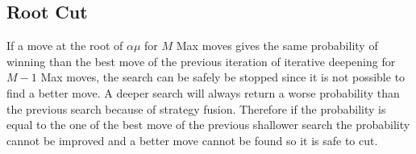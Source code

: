 \documentclass{ecai}
\begin{document}





\subsection{Root Cut}

If a move at the root of $\alpha\mu$ for $M$ Max moves gives the same
probability of winning than the best move of the previous iteration of
iterative deepening for $M-1$ Max moves, the search can be safely be
stopped since it is not possible to find a better move. A deeper
search will always return a worse probability than the previous search
because of strategy fusion. Therefore if the probability is equal to
the one of the best move of the previous shallower search the
probability cannot be improved and a better move cannot be found so it
is safe to cut.
\end{document}
